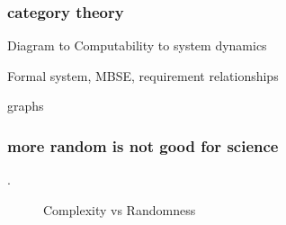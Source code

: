 \newpage
\begin{frame}
\frametitle{ category theory }
\begin{block}{Diagram  to Computability  to system dynamics }

Formal system,
MBSE, 
requirement  relationships 

graphs 
\end{block}
\end{frame} 



\newpage
\begin{frame}
\frametitle{ more random is not good for science }
\begin{block}{.}
 \begin{figure}[scale =0.56]
	\caption{Complexity vs Randomness  }
	\label{poisson1d}
 
\end{figure}
 
\end{block}
\end{frame} 

